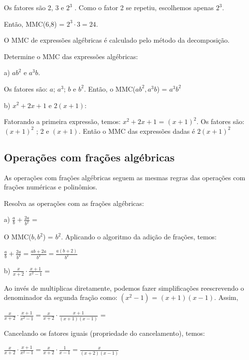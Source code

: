 Os fatores são 2, 3 e $2^3$ . Como o fator 2 se repetiu, escolhemos apenas $2^3$. 

Então, MMC(6,8) =  $2^3 \cdot 3  = 24$.

O MMC de expressões algébricas é calculado pelo método da decomposição.

\begin{texemplo}
Determine o MMC das expressões algébricas:

a) $ab^2 $ e $a^3b$.

Os fatores são: $a$; $a^3$; $b$ e $b^2$. Então, o MMC($ab^2, a^3b$) = $a^3b^2$

b) $x^2+2x+1$ e $2(x+1)$:

Fatorando a primeira expressão, temos: $x^2+2x+1$ = $(x + 1)^2$. 
Os fatores são: $(x + 1)^2$ ; 2 e $(x+1)$. Então o MMC das expressões dadas é $2(x + 1)^2$ \qedsymbol{}

\end{texemplo}

\subsection{Operações com frações algébricas}

As operações com frações algébricas seguem as mesmas regras das operações com frações numéricas e polinômios.

\begin{texemplo}
Resolva as operações com as frações algébricas:

{\large a) $\frac{a}{b}+\frac{2a}{b^2}$ =}

O MMC($b,b^2$) = $b^2$. Aplicando o algoritmo da adição de frações, temos:

\begin{center}{\large
$\frac{a}{b}+\frac{2a}{b^2}=\frac{ab+2a}{b^2}=\frac{a(b+2)}{b^2}$
}\end{center}

{\large b) $\frac{x}{x+2} \cdot \frac{x+1}{x^2-1}$ =}

Ao invés de multiplicas diretamente, podemos fazer simplificações reescrevendo o denominador da segunda fração como: $(x^2 - 1)$ = $(x+1)(x-1)$. Assim,

\begin{center}{\large
$\frac{x}{x+2} \cdot \frac{x+1}{x^2-1} = \frac{x}{x+2} \cdot \frac{x+1}{(x+1)(x-1)}$ =
}\end{center}

Cancelando os fatores iguais (propriedade do cancelamento), temos:

\begin{center}{\large
$\frac{x}{x+2} \cdot \frac{x+1}{x^2-1} = \frac{x}{x+2} \cdot \frac{1}{x-1} = \frac{x}{(x+2)(x-1)}$ ~~~~
}\qedsymbol{}\end{center}
\end{texemplo}

